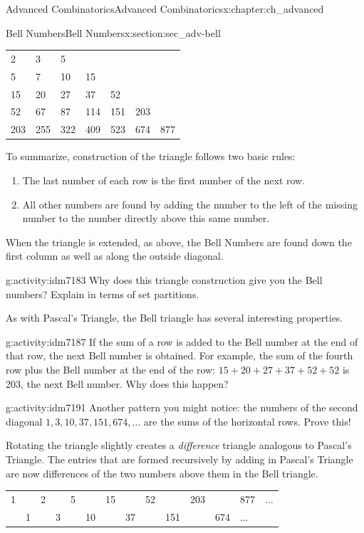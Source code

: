 \documentclass[oneside,10pt,]{book}
\numberwithin{equation}{chapter}
\begin{document}
\begin{chapterptx}{Advanced Combinatorics}{}{Advanced Combinatorics}{}{}{x:chapter:ch_advanced}
\begin{sectionptx}{Bell Numbers}{}{Bell Numbers}{}{}{x:section:sec_adv-bell}
\begin{sidebyside}{1}{0.15}{0.15}{0}
\begin{sbspanel}{0.7}
{\begin{tabular}{lllllll}
2&3&5&&&&\tabularnewline[0pt]
5&7&10&15&&&\tabularnewline[0pt]
15&20&27&37&52&&\tabularnewline[0pt]
52&67&87&114&151&203&\tabularnewline[0pt]
203&255&322&409&523&674&877
\end{tabular}
\par}
\end{sbspanel}%
\end{sidebyside}%
\par
To summarize, construction of the triangle follows two basic rules:%
\begin{enumerate}
\item{}The last number of each row is the first number of the next row.%
\item{}All other numbers are found by adding the number to the left of the missing number to the number directly above this same number.%
\end{enumerate}
When the triangle is extended, as above, the Bell Numbers are found down the first column as well as along the outside diagonal.%
\begin{activity}{}{g:activity:idm7183}%
Why does this triangle construction give you the Bell numbers?  Explain in terms of set partitions.%
\end{activity}
As with Pascal's Triangle, the Bell triangle has several interesting properties.%
\begin{activity}{}{g:activity:idm7187}%
If the sum of a row is added to the Bell number at the end of that row, the next Bell number is obtained. For example, the sum of the fourth row plus the Bell number at the end of the row: \(15 + 20 + 27 + 37 + 52 + 52\) is 203, the next Bell number.  Why does this happen?%
\end{activity}
\begin{activity}{}{g:activity:idm7191}%
Another pattern you might notice: the numbers of the second diagonal \(1, 3, 10, 37, 151, 674, \ldots\) are the sums of the horizontal rows.  Prove this!%
\end{activity}
Rotating the triangle slightly creates a \emph{difference} triangle analogous to Pascal's Triangle. The entries that are formed recursively by adding in Pascal's Triangle are now differences of the two numbers above them in the Bell triangle.%
\begin{sidebyside}{1}{0}{0}{0}%
\begin{sbspanel}{1}%
{\centering%
\begin{tabular}{llllllllllllll}
1&&2&&5&&15&&52&&203&&877&\(\ldots\)\tabularnewline[0pt]
&1&&3&&10&&37&&151&&674&\(\ldots\)&\tabularnewline[0pt]

\end{tabular}}
\end{sbspanel}
\end{sidebyside}
\end{sectionptx}
\end{chapterptx}
\end{document}
